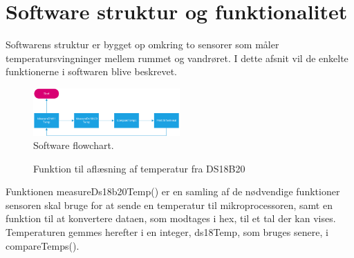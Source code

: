 \section{Software struktur og funktionalitet}
Softwarens struktur er bygget op omkring to sensorer som måler temperatursvingninger mellem rummet og vandrøret. I dette afsnit vil de enkelte funktionerne i softwaren blive beskrevet. 
\begin{figure}[h!]
  \centering
  \includegraphics[width=0.5\textwidth]{figures/Fase1software2.png}
  \caption{Software flowchart.}
  \label{fase1flow}
\end{figure}


\begin{figure}[h!]
  \centering
  \caption{Funktion til aflæsning af temperatur fra DS18B20}
  \label{ds18b20Measure}
\end{figure}
Funktionen measureDs18b20Temp() er en samling af de nødvendige funktioner sensoren skal bruge for at sende en temperatur til mikroprocessoren, samt en funktion til at konvertere dataen, som modtages i hex, til et tal der kan vises.\newline
Temperaturen gemmes herefter i en integer, ds18Temp, som bruges senere, i compareTemps().\\\\

